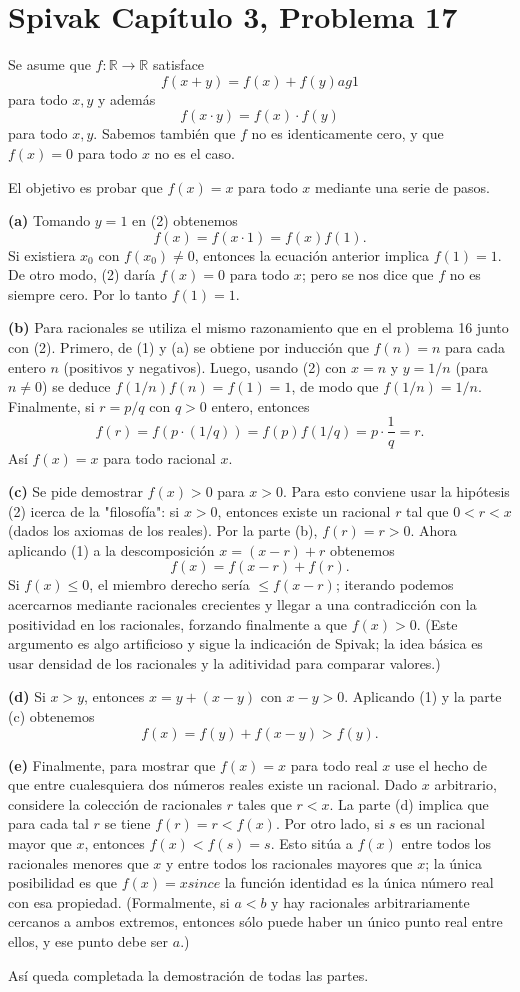 \section*{Spivak Capítulo 3, Problema 17}

Se asume que $f:\mathbb{R}\to\mathbb{R}$ satisface
\[f(x+y)=f(x)+f(y)	ag{1}\]
para todo $x,y$ y además
\[f(x\cdot y)=f(x)\cdot f(y)\tag{2}\]
para todo $x,y$. Sabemos también que $f$ no es identicamente cero, y que
$f(x)=0$ para todo $x$ no es el caso.

El objetivo es probar que $f(x)=x$ para todo $x$ mediante una serie de pasos.

\textbf{(a)} Tomando $y=1$ en (2) obtenemos
$$f(x)=f(x\cdot1)=f(x)f(1).$$
Si existiera $x_0$ con $f(x_0)\neq0$, entonces la ecuación anterior
implica $f(1)=1$. De otro modo, (2) daría $f(x)=0$ para todo $x$; pero se
nos dice que $f$ no es siempre cero. Por lo tanto $f(1)=1$.

\textbf{(b)} Para racionales se utiliza el mismo razonamiento que en el
problema 16 junto con (2). Primero, de (1) y (a) se obtiene por inducción
que $f(n)=n$ para cada entero $n$ (positivos y negativos). Luego, usando
(2) con $x=n$ y $y=1/n$ (para $n\neq0$) se deduce $f(1/n)f(n)=f(1)=1$, de
modo que $f(1/n)=1/n$. Finalmente, si $r=p/q$ con $q>0$ entero, entonces
$$f(r)=f(p\cdot(1/q))=f(p)f(1/q)=p\cdot\frac1q=r.$$ Así $f(x)=x$ para todo
racional $x$.

\textbf{(c)} Se pide demostrar $f(x)>0$ para $x>0$. Para esto conviene usar
la hipótesis (2) icerca de la "filosofía": si $x>0$, entonces existe un racional
$r$ tal que $0<r<x$ (dados los axiomas de los reales). Por la parte (b),
$f(r)=r>0$. Ahora aplicando (1) a la descomposición $x=(x-r)+r$ obtenemos
$$f(x)=f(x-r)+f(r).$$ Si $f(x)\le0$, el miembro derecho sería $\le f(x-r)$;
iterando podemos acercarnos mediante racionales crecientes y llegar a una
contradicción con la positividad en los racionales, forzando finalmente a
que $f(x)>0$. (Este argumento es algo artificioso y sigue la indicación
de Spivak; la idea básica es usar densidad de los racionales y la aditividad
para comparar valores.)

\textbf{(d)} Si $x>y$, entonces $x=y+(x-y)$ con $x-y>0$. Aplicando (1) y la
parte (c) obtenemos
$$f(x)=f(y)+f(x-y)>f(y).$$

\textbf{(e)} Finalmente, para mostrar que $f(x)=x$ para todo real $x$ use
el hecho de que entre cualesquiera dos números reales existe un racional.
Dado $x$ arbitrario, considere la colección de racionales $r$ tales que
$r<x$. La parte (d) implica que para cada tal $r$ se tiene $f(r)=r<f(x)$. Por
otro lado, si $s$ es un racional mayor que $x$, entonces $f(x)<f(s)=s$.
Esto sitúa a $f(x)$ entre todos los racionales menores que $x$ y entre todos
los racionales mayores que $x$; la única posibilidad es que $f(x)=x
since$ la función identidad es la única número real con esa propiedad.
(Formalmente, si $a<b$ y hay racionales arbitrariamente cercanos a ambos
extremos, entonces sólo puede haber un único punto real entre ellos, y ese
punto debe ser $a$.)

Así queda completada la demostración de todas las partes.